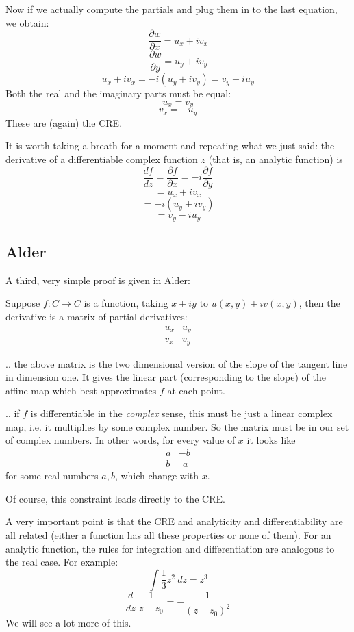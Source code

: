 \documentclass[11pt, oneside]{article}
\begin{document}
Now if we actually compute the partials and plug them in to the last equation, we obtain:
\[ \frac{\partial w}{\partial x} = u_x + i v_x \]
\[ \frac{\partial w}{\partial y} = u_y + i v_y \]
\[ u_x + i v_x = -i (u_y + i v_y) = v_y - i u_y \]
Both the real and the imaginary parts must be equal:
\[ u_x = v_y \]
\[ v_x = - u_y \]
These are (again) the CRE.

It is worth taking a breath for a moment and repeating what we just said:  the derivative of a differentiable complex function $z$ (that is, an analytic function) is
\[ \frac{df}{dz} = \frac{\partial f}{\partial x} = - i \frac{\partial f}{\partial y} \]
\[ = u_x + i v_x \]
\[ = -i (u_y + i v_y) \]
\[ = v_y - i u_y\] 

\subsection*{Alder}
A third, very simple proof is given in Alder:

Suppose $f: C \rightarrow C$ is a function, taking $x+iy$ to $u(x,y) + iv(x,y)$, then the derivative is a matrix of partial derivatives:
\[
\begin{matrix}
u_x &  u_y \\
v_x & v_y
\end{matrix}
\]

.. the above matrix is the two dimensional version of the slope of the tangent line in dimension one.  It gives the linear part (corresponding to the slope) of the affine map which best approximates $f$ at each point.

.. if $f$ is differentiable in the \emph{complex} sense, this must be just a linear complex map, i.e. it multiplies by some complex number.  So the matrix must be in our set of complex numbers.  In other words, for every value of $x$ it looks like
\[
\begin{matrix}
a & -b \\
b &  \ \ a
\end{matrix}
\]
for some real numbers $a,b$, which change with $x$.

Of course, this constraint leads directly to the CRE.

A very important point is that the CRE and analyticity and differentiability are all related  (either a function has all these properties or none of them).  For an analytic function, the rules for integration and differentiation are analogous to the real case.  For example:
\[ \int \frac{1}{3} z^2 \ dz = z^3 \]
\[ \frac{d}{dz} \ \frac{1}{z - z_0} = - \frac{1}{(z-z_0)^2} \]
We will see a lot more of this.
\end{document}
